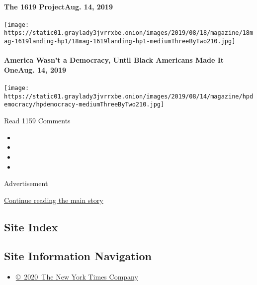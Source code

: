\hypertarget{the-1619-projectaug-14-2019-1}{%
\paragraph{The 1619 ProjectAug. 14,
2019}\label{the-1619-projectaug-14-2019-1}}

\texttt{[image: https://static01.graylady3jvrrxbe.onion/images/2019/08/18/magazine/18mag-1619landing-hp1/18mag-1619landing-hp1-mediumThreeByTwo210.jpg]}
\href{https://www.nytimes3xbfgragh.onion/interactive/2019/08/14/magazine/black-history-american-democracy.html}{}

\hypertarget{america-wasnt-a-democracy-until-black-americans-made-it-oneaug-14-2019-1}{%
\paragraph{America Wasn't a Democracy, Until Black Americans Made It
OneAug. 14,
2019}\label{america-wasnt-a-democracy-until-black-americans-made-it-oneaug-14-2019-1}}

\texttt{[image: https://static01.graylady3jvrrxbe.onion/images/2019/08/14/magazine/hpdemocracy/hpdemocracy-mediumThreeByTwo210.jpg]}

Read 1159 Comments

\begin{itemize}
\item
\item
\item
\item
\end{itemize}

Advertisement

\protect\hyperlink{after-bottom}{Continue reading the main story}

\hypertarget{site-index}{%
\subsection{Site Index}\label{site-index}}

\hypertarget{site-information-navigation}{%
\subsection{Site Information
Navigation}\label{site-information-navigation}}

\begin{itemize}
\tightlist
\item
  \href{https://help.nytimes3xbfgragh.onion/hc/en-us/articles/115014792127-Copyright-notice}{©~2020~The
  New York Times Company}
\end{itemize}

